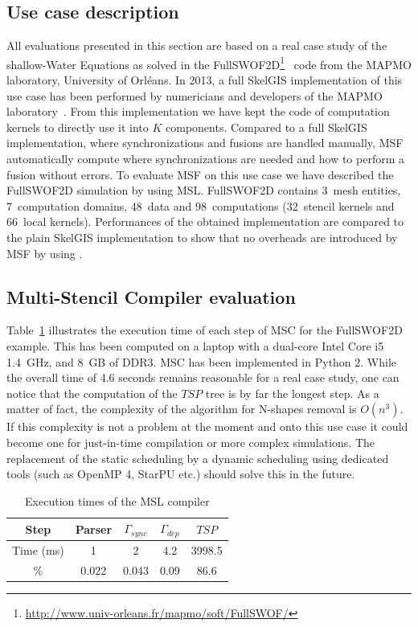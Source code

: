 \subsection{Use case description}

All evaluations presented in this section are based on a real case study of the shallow-Water Equations as solved in the FullSWOF2D\footnote{\url{http://www.univ-orleans.fr/mapmo/soft/FullSWOF/}}~\cite{Ferrari2004,CPE:CPE3494} code from the MAPMO laboratory, University of Orl\'eans.
In 2013, a full SkelGIS implementation of this use case has been performed by numericians and developers of the MAPMO laboratory~\cite{CPE:CPE3494,cordier2013fullswof,coullon:hal-00832660}. From this implementation we have kept the code of computation kernels to directly use it into $K$ components. Compared to a full SkelGIS implementation, where synchronizations and fusions are handled manually, MSF automatically compute where synchronizations are needed and how to perform a fusion without errors. To evaluate MSF on this use case we have described the FullSWOF2D simulation by using MSL. FullSWOF2D contains 3~mesh entities, 7~computation domains, 48~data and 98~computations (32~stencil kernels and 66~local kernels). Performances of the obtained implementation are compared to the plain SkelGIS implementation to show that no overheads are introduced by MSF by using \llc.

\subsection{Multi-Stencil Compiler evaluation}

Table~\ref{fig:exectime} illustrates the execution time of each step of MSC for the FullSWOF2D example.
This has been computed on a laptop with a dual-core Intel Core i5 1.4~GHz, and 8~GB of DDR3.
MSC has been implemented in Python 2.
%
While the overall time of 4.6 seconds remains reasonable for a real case study, one can notice that the computation of the $TSP$ tree is by far the longest step.
As a matter of fact, the complexity of the algorithm for N-shapes removal is $O(n^3)$.
If this complexity is not a problem at the moment and onto this use case it could become one for just-in-time compilation or more complex simulations. The replacement of the static scheduling by a dynamic scheduling using dedicated tools (such as OpenMP 4, StarPU etc.) should solve this in the future.

\begin{table}[!h]
 \begin{center}
 \begin{tabular}{|c|c|c|c|c|}
   Step & Parser & $\Gamma_{sync}$ & $\Gamma_{dep}$ & $TSP$\\
   \hline
   Time (ms) & 1 & 2 & 4.2 & 3998.5\\
   \% & 0.022 & 0.043 & 0.09 & 86.6\\
 \end{tabular}
\caption{Execution times of the MSL compiler}
\label{fig:exectime}
 \end{center}
\end{table}

